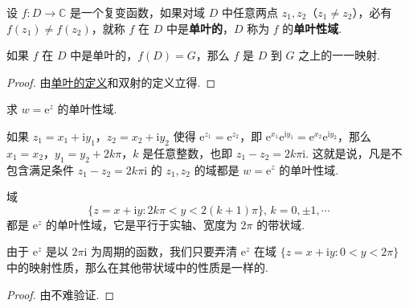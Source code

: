 \documentclass[../../main.tex]{subfiles}
\begin{document}
\begin{definition}\label{definition:单叶性域}
设 \( f:D \to \mathbb{C} \) 是一个复变函数，如果对域 \( D \) 中任意两点 \( z_1, z_2 \)（\( z_1 \neq z_2 \)），必有 \( f(z_1) \neq f(z_2) \)，就称 \( f \) 在 \( D \) 中是\textbf{单叶的}，\( D \) 称为 \( f \) 的\textbf{单叶性域}.
\end{definition}

\begin{proposition}
如果 \( f \) 在 \( D \) 中是单叶的，\( f(D) = G \)，那么 \( f \) 是 \( D \) 到 \( G \) 之上的一一映射.
\end{proposition}
\begin{proof}
由\hyperref[definition:单叶性域]{单叶的定义}和双射的定义立得.

\end{proof}

\begin{proposition}\label{proposition:复变函数的指数函数的单叶性域}
求 \( w = \mathrm{e}^z \) 的单叶性域.
\end{proposition}
\begin{solution}
如果 \( z_1 = x_1 + \mathrm{i}y_1 \)，\( z_2 = x_2 + \mathrm{i}y_2 \) 使得 \( \mathrm{e}^{z_1} = \mathrm{e}^{z_2} \)，即 \( \mathrm{e}^{x_1} \mathrm{e}^{\mathrm{i}y_1} = \mathrm{e}^{x_2} \mathrm{e}^{\mathrm{i}y_2} \)，那么 \( x_1 = x_2 \)，\( y_1 = y_2 + 2k\pi \)，\( k \) 是任意整数，也即 \( z_1 - z_2 = 2k\pi \mathrm{i} \). 这就是说，凡是不包含满足条件 \( z_1 - z_2 = 2k\pi \mathrm{i} \) 的 \( z_1, z_2 \) 的域都是 \( w = \mathrm{e}^z \) 的单叶性域. 

\end{solution}

\begin{proposition}
域
\[
\{ z = x + \mathrm{i}y : 2k\pi < y < 2(k + 1)\pi \}, \, k = 0, \pm 1, \cdots
\]
都是 \( \mathrm{e}^z \) 的单叶性域，它是平行于实轴、宽度为 \( 2\pi \) 的带状域.
\end{proposition}
\begin{note}
由于 \( \mathrm{e}^z \) 是以 \( 2\pi \mathrm{i} \) 为周期的函数，我们只要弄清 \( \mathrm{e}^z \) 在域 \( \{ z = x + \mathrm{i}y : 0 < y < 2\pi \} \) 中的映射性质，那么在其他带状域中的性质是一样的.
\end{note}
\begin{proof}
由不难验证.

\end{proof}
\end{document}
